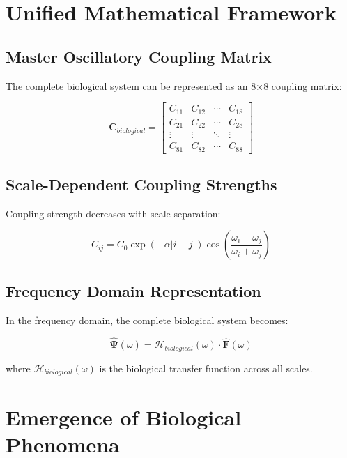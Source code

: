 \documentclass[twocolumn]{article}
\begin{document}
\section{Unified Mathematical Framework}

\subsection{Master Oscillatory Coupling Matrix}

The complete biological system can be represented as an 8×8 coupling matrix:

\begin{equation}
\mathbf{C}_{biological} = \begin{bmatrix}
C_{11} & C_{12} & \cdots & C_{18} \\
C_{21} & C_{22} & \cdots & C_{28} \\
\vdots & \vdots & \ddots & \vdots \\
C_{81} & C_{82} & \cdots & C_{88}
\end{bmatrix}
\end{equation}

\subsection{Scale-Dependent Coupling Strengths}

Coupling strength decreases with scale separation:

\begin{equation}
C_{ij} = C_0 \exp\left(-\alpha|i-j|\right) \cos\left(\frac{\omega_i - \omega_j}{\omega_i + \omega_j}\right)
\end{equation}

\subsection{Frequency Domain Representation}

In the frequency domain, the complete biological system becomes:

\begin{equation}
\hat{\mathbf{\Psi}}(\omega) = \mathcal{H}_{biological}(\omega) \cdot \hat{\mathbf{F}}(\omega)
\end{equation}

where $\mathcal{H}_{biological}(\omega)$ is the biological transfer function across all scales.

\section{Emergence of Biological Phenomena}
\end{document}
